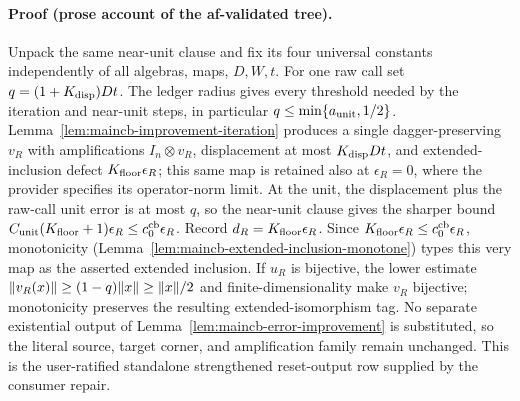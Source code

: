 \paragraph{Proof (prose account of the af-validated tree).}
Unpack the same near-unit clause and fix its four universal constants independently of all
algebras, maps, $D,W,t$.  For one raw call set $q=(1+K_{\rm disp})Dt$.  The ledger radius
gives every threshold needed by the iteration and near-unit steps, in particular
$q\le\min\{a_{\rm unit},1/2\}$.  Lemma~\ref{lem:maincb-improvement-iteration} produces a
single dagger-preserving $v_R$ with amplifications $I_n\otimes v_R$, displacement at most
$K_{\rm disp}Dt$, and extended-inclusion defect $K_{\rm floor}\epsilon_R$; this same map is
retained also at $\epsilon_R=0$, where the provider specifies its operator-norm limit.
At the unit, the displacement plus the raw-call unit error is at most $q$, so the near-unit
clause gives the sharper bound
$C_{\rm unit}(K_{\rm floor}+1)\epsilon_R\le c_0^{\rm cb}\epsilon_R$.
Record $d_R=K_{\rm floor}\epsilon_R$.  Since
$K_{\rm floor}\epsilon_R\le c_0^{\rm cb}\epsilon_R$, monotonicity
(Lemma~\ref{lem:maincb-extended-inclusion-monotone}) types this very map as the asserted
extended inclusion.  If $u_R$ is bijective, the lower estimate
$\lVert v_R(x)\rVert\ge(1-q)\lVert x\rVert\ge\lVert x\rVert/2$ and finite-dimensionality make $v_R$ bijective;
monotonicity preserves the resulting extended-isomorphism tag.  No separate existential
output of Lemma~\ref{lem:maincb-error-improvement} is substituted, so the literal source,
target corner, and amplification family remain unchanged.
This is the user-ratified standalone strengthened reset-output row supplied by the consumer repair.
